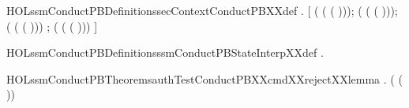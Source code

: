 \newcommand{\HOLssmConductPBDate}{13 May 2018}
\newcommand{\HOLssmConductPBTime}{18:23}
\begin{SaveVerbatim}{HOLssmConductPBDefinitionssecContextConductPBXXdef}
\HOLTokenTurnstile{} \HOLSymConst{\HOLTokenForall{}}  .
         \HOLSymConst{=}
     [    ( ( ( )));
        
       ( ( ( )));
        
       ( ( ( )))   ;
        
       ( ( ( )))   ]
\end{SaveVerbatim}
\newcommand{\HOLssmConductPBDefinitionssecContextConductPBXXdef}{\UseVerbatim{HOLssmConductPBDefinitionssecContextConductPBXXdef}}
\begin{SaveVerbatim}{HOLssmConductPBDefinitionsssmConductPBStateInterpXXdef}
\HOLTokenTurnstile{} \HOLSymConst{\HOLTokenForall{}}.   \HOLSymConst{=} 
\end{SaveVerbatim}
\newcommand{\HOLssmConductPBDefinitionsssmConductPBStateInterpXXdef}{\UseVerbatim{HOLssmConductPBDefinitionsssmConductPBStateInterpXXdef}}
\newcommand{\HOLssmConductPBDefinitions}{
\HOLDfnTag{ssmConductPB}{secContextConductPB_def}\HOLssmConductPBDefinitionssecContextConductPBXXdef
\HOLDfnTag{ssmConductPB}{ssmConductPBStateInterp_def}\HOLssmConductPBDefinitionsssmConductPBStateInterpXXdef
}
\begin{SaveVerbatim}{HOLssmConductPBTheoremsauthTestConductPBXXcmdXXrejectXXlemma}
\HOLTokenTurnstile{} \HOLSymConst{\HOLTokenForall{}}. \HOLSymConst{\HOLTokenNeg{}} ( ( ))
\end{SaveVerbatim}
\newcommand{\HOLssmConductPBTheoremsauthTestConductPBXXcmdXXrejectXXlemma}{\UseVerbatim{HOLssmConductPBTheoremsauthTestConductPBXXcmdXXrejectXXlemma}}
